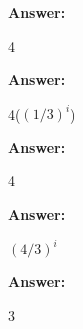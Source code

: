 \documentclass[12pt,twoside]{article}
\newcommand{\answer}{
 \par\medskip
 \textbf{Answer:}
}
\newcommand{\answerIn}{ \answer
4
}
\newcommand{\answerIo}{ \answer
4($ (1/3)^i $)
}
\newcommand{\answerIp}{ \answer
4
}
\newcommand{\answerIq}{ \answer
$ (4/3)^i $
}
\newcommand{\answerIr}{ \answer
3
}
\begin{document}
\begin{problems}
\begin{problemparts}
\begin{problemparts}
\answerIn

\answerIo

\answerIp

\answerIq

\answerIr


\end{problemparts}
\end{problemparts}
\end{problems}
\end{document}

